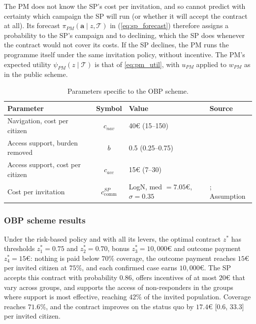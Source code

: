 \documentclass[12pt]{article}
\begin{document}
The PM does not know the SP's cost per invitation, and so cannot predict with certainty which campaign the SP will run (or whether it will accept the contract at all). Its forecast $\pi_{PM}(\mathbf{a} \mid z, \mathcal{T})$ in (\ref{eq:sp_forecast}) therefore assigns a probability to the SP's campaign and to declining, which the SP does whenever the contract would not cover its costs. If the SP declines, the PM runs the programme itself under the same invitation policy, without incentive. The PM's expected utility $\psi_{PM}(z \mid \mathcal{T})$ is that of \eqref{eq:pm_util}, with $u_{PM}$ applied to $w_{PM}$ as in the public scheme.

\begin{table}[htbp]
\centering
\footnotesize
\caption{Parameters specific to the OBP scheme.}
\label{tab:obp_params}
\begin{tabular}{l c l l}
\toprule
\textbf{Parameter} & \textbf{Symbol} & \textbf{Value} & \textbf{Source} \\
\midrule
Navigation, cost per citizen & $c_{nav}$ & 40€ (15--150) & \citealp{reynolds2025increasing} \\
Access support, burden removed & $b$ & 0.5 (0.25--0.75) & \cite{baron2008client} \\
Access support, cost per citizen & $c_{acc}$ & 15€ (7--30) & \cite{della2023community} \\
Cost per invitation & $c^{SP}_{\text{comm}}$ & LogN, med $= 7.05$€, $\sigma = 0.35$ &  \cite{arrospide2018cost}; Assumption \\
\bottomrule
\end{tabular}
\end{table}



\subsubsection{OBP scheme results}\label{sec:obp_scheme_results}
Under the risk-based policy and with all its levers, the optimal contract $z^*$ has thresholds $z_1^* = 0.75$ and $z_2^* = 0.70$, bonus $z_3^* = 10{,}000$€ and outcome payment $z_4^* = 15$€: nothing is paid below $70\%$ coverage, the outcome payment reaches $15$€ per invited citizen at $75\%$, and each confirmed case earns $10{,}000$€. The SP accepts this contract with probability $0.86$, offers incentives of at most $20$€ that vary across groups, and supports the access of non-responders in the groups where support is most effective, reaching $42\%$ of the invited population. Coverage reaches $71.6\%$, and the contract improves on the status quo by $17.4$€ [$0.6$, $33.3$] per invited citizen.
\end{document}

